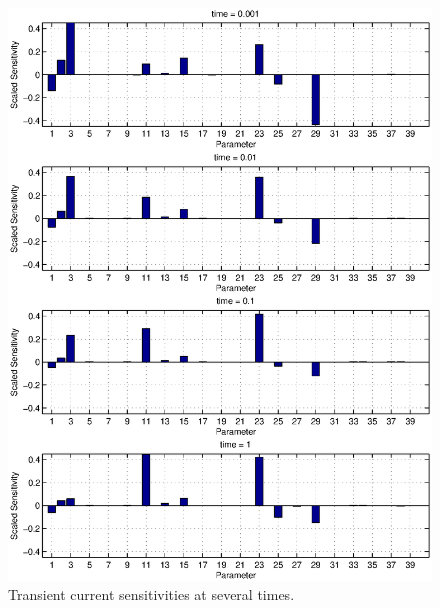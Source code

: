 \documentclass[pdf,ps2pdf,11pt]{SANDreport}
\begin{document}
{\bsinglespace
\begin{figure}[p]
\begin{center}
\includegraphics*[width=5in]{sensitivities_hist_report}
\end{center}
\caption[Transient current sensitivities at several times]{
\label{fig:SensitivitesHist}
Transient current sensitivities at several times.}
\end{figure}
\esinglespace}
\end{document}
